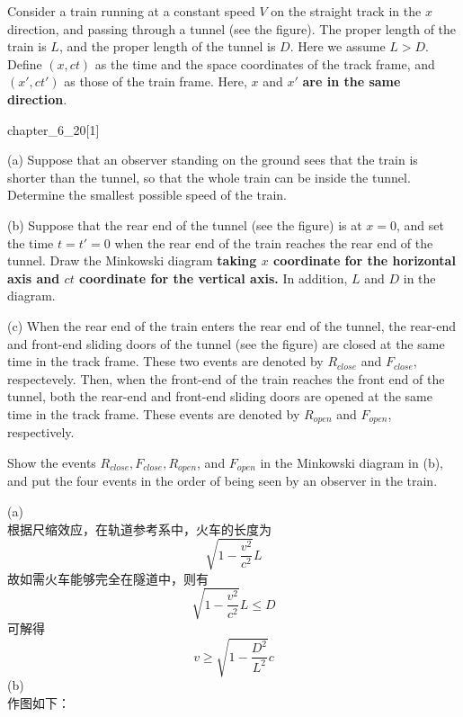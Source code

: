 \begin{solution}
    Consider a train running at a constant speed $V$ on the straight track in the $x$ direction, and passing through a tunnel (see the figure). The proper length of the train is $L$, and the proper length of the tunnel is $D$. Here we assume $L>D$. Define $(x,ct)$ as the time and the space coordinates of the track frame, and $(x',ct')$ as those of the train frame. Here, $x$ and $x' $\textbf{ are in the same direction}.
    \begin{singlefigure}{chapter_6_20}[1]
    \end{singlefigure}
    (a) Suppose that an observer standing on the ground sees that the train is shorter than the tunnel, so that the whole train can be inside the tunnel. Determine the smallest possible speed of the train.

    (b) Suppose that the rear end of the tunnel (see the figure) is at $x=0$, and set the time $t=t'=0$ when the rear end of the train reaches the rear end of the tunnel. Draw the Minkowski diagram \textbf{ taking $x$ coordinate for the horizontal axis and $ct$ coordinate for the vertical axis.} In addition,  $L$ and $D$ in the diagram.

    (c) When the rear end of the train enters the rear end of the tunnel, the rear-end and front-end sliding doors of the tunnel (see the figure) are closed at the same time in the track frame. These two events are denoted by $R_{close}$ and $F_{close}$, respectevely. Then, when the front-end of the train reaches the front end of the tunnel, both the rear-end and front-end sliding doors are opened at the same time in the track frame. These events are denoted by $R_{open}$ and $F_{open}$, respectively.

    Show the events $R_{close},F_{close},R_{open}$, and $F_{open}$ in the Minkowski diagram in (b),
    and put the four events in the order of being seen by an observer in the train.

    \tcbrule

    (a)
    \\根据尺缩效应，在轨道参考系中，火车的长度为
    \[\sqrt{1-\dfrac{v^2}{c^2}}L\]
    故如需火车能够完全在隧道中，则有
    \[\sqrt{1-\dfrac{v^2}{c^2}}L\le D\]
    可解得
    \[v\ge \sqrt{1-\dfrac{D^2}{L^2}}c\]
    (b)\\
    作图如下：
    \begin{center}
    \end{center}


\end{solution}
